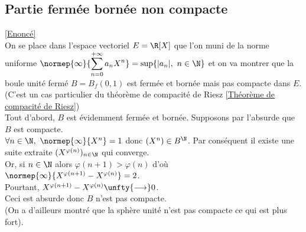\documentclass{book}
\begin{document}
	\subsection{Partie fermée bornée non compacte }
	\label{sec:partie-fermee-bornee-non-compacte-etoile3}
	\textcolor{blue}{\hyperref[Partie fermée bornée non compacte]{[Enoncé]}}\\
	On se place dans l'espace vectoriel $E=\R[X]$ que l'on muni de la norme uniforme $\normep{\infty}{\displaystyle\sum\limits_{n=0}^{+\infty}a_nX^n}=\sup\{|a_n|,\ n\in \N\}$ et on va montrer que la boule unité fermé $B=B_f(0,1)$ est fermée et bornée mais pas compacte dans $E$. (C'est un cas particulier du théorème de compacité de Riesz \ref{Théorème de compacité de Riesz})\\
	Tout d'abord, $B$ est évidemment fermée et bornée. Supposons par l'absurde que $B$ est compacte.\\
	$\forall n\in \N,\ \normep{\infty}{X^n}=1$ donc $(X^n)\in B^\N$. Par conséquent il existe une suite extraite $(X^{\varphi(n)})_{n\in \N}$ qui converge.\\
	Or, si $n\in \N$ alors $\varphi(n+1)>\varphi(n)$ d'où $\normep{\infty}{X^{\varphi(n+1)}-X^{\varphi(n)}}=2$.\\
	Pourtant, $X^{\varphi(n+1)}-X^{\varphi(n)}\unfty{\longrightarrow}0$.\\
	Ceci est absurde donc $B$ n'est pas compacte.\\
	(On a d'ailleurs montré que la sphère unité n'est pas compacte ce qui est plus fort).
	
\end{document}
